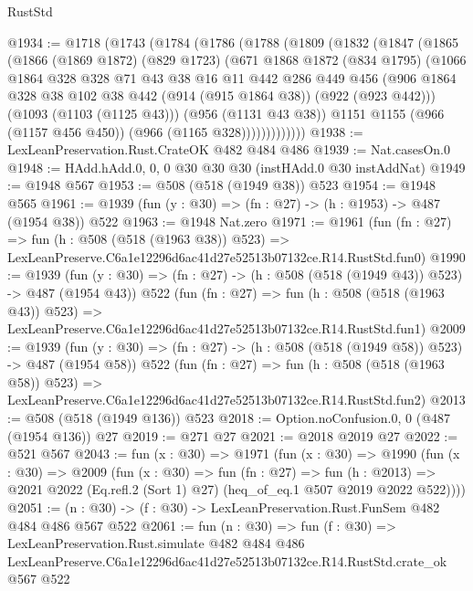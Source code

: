 \begin{lexlean}{RustStd}
\begin{coremodule}
@1934 := @1718
    (@1743
      (@1784
        (@1786
          (@1788
            (@1809
              (@1832
                (@1847
                  (@1865
                    (@1866
                      (@1869 @1872)
                      (@829 @1723)
                      (@671
                        @1868
                        @1872
                        (@834 @1795)
                        (@1066
                          @1864
                          @328
                          @328
                          @71
                          @43
                          @38
                          @16
                          @11
                          @442
                          @286
                          @449
                          @456
                          (@906
                            @1864
                            @328
                            @38
                            @102
                            @38
                            @442
                            (@914 (@915 @1864 @38))
                            (@922 (@923 @442)))
                          (@1093 (@1103 (@1125 @43)))
                          (@956 (@1131 @43 @38))
                          @1151
                          @1155
                          (@966 (@1157 @456 @450))
                          (@966 (@1165 @328)))))))))))))
@1938 := LexLeanPreservation.Rust.CrateOK @482 @484 @486
@1939 := Nat.casesOn.{0}
@1948 := HAdd.hAdd.{0, 0, 0} @30 @30 @30 (instHAdd.{0} @30 instAddNat)
@1949 := @1948 @567
@1953 := @508 (@518 (@1949 @38)) @523
@1954 := @1948 @565
@1961 := @1939 (fun (y : @30) => (fn : @27) -> (h : @1953) -> @487 (@1954 @38)) @522
@1963 := @1948 Nat.zero
@1971 := @1961
    (fun (fn : @27) =>
    fun (h : @508 (@518 (@1963 @38)) @523) =>
    LexLeanPreserve.C6a1e12296d6ac41d27e52513b07132ce.R14.RustStd.fun0)
@1990 := @1939
    (fun (y : @30) => (fn : @27) -> (h : @508 (@518 (@1949 @43)) @523) -> @487 (@1954 @43))
    @522
    (fun (fn : @27) =>
    fun (h : @508 (@518 (@1963 @43)) @523) =>
    LexLeanPreserve.C6a1e12296d6ac41d27e52513b07132ce.R14.RustStd.fun1)
@2009 := @1939
    (fun (y : @30) => (fn : @27) -> (h : @508 (@518 (@1949 @58)) @523) -> @487 (@1954 @58))
    @522
    (fun (fn : @27) =>
    fun (h : @508 (@518 (@1963 @58)) @523) =>
    LexLeanPreserve.C6a1e12296d6ac41d27e52513b07132ce.R14.RustStd.fun2)
@2013 := @508 (@518 (@1949 @136)) @523
@2018 := Option.noConfusion.{0, 0} (@487 (@1954 @136)) @27
@2019 := @271 @27
@2021 := @2018 @2019 @27
@2022 := @521 @567
@2043 := fun (x : @30) =>
  @1971
    (fun (x : @30) =>
    @1990
      (fun (x : @30) =>
      @2009
        (fun (x : @30) =>
        fun (fn : @27) =>
        fun (h : @2013) =>
        @2021 @2022 (Eq.refl.{2} (Sort 1) @27) (heq_of_eq.{1} @507 @2019 @2022 @522))))
@2051 := (n : @30) -> (f : @30) -> LexLeanPreservation.Rust.FunSem @482 @484 @486 @567 @522
@2061 := fun (n : @30) =>
  fun (f : @30) =>
  LexLeanPreservation.Rust.simulate
    @482
    @484
    @486
    LexLeanPreserve.C6a1e12296d6ac41d27e52513b07132ce.R14.RustStd.crate_ok
    @567
    @522
\end{coremodule}
\end{lexlean}
